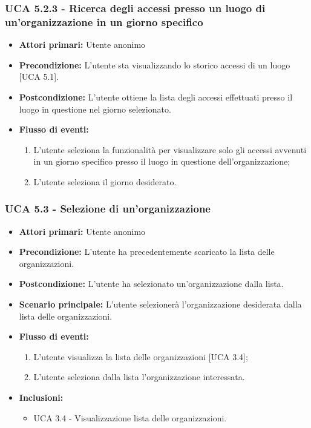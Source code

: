 \subsubsection{UCA 5.2.3 - Ricerca degli accessi presso un luogo di un'organizzazione in un giorno specifico}
\begin{itemize}
    \item \textbf{Attori primari:} Utente anonimo
    \item \textbf{Precondizione:} L'utente sta visualizzando lo storico accessi di un luogo [UCA 5.1].
    \item \textbf{Postcondizione:} L'utente ottiene la lista degli accessi effettuati presso il luogo in questione nel giorno selezionato.
    \item \textbf{Flusso di eventi:}
    \begin{enumerate}
        \item L'utente seleziona la funzionalità per visualizzare solo gli accessi avvenuti in un giorno specifico presso il luogo in questione dell'organizzazione;
        \item L'utente seleziona il giorno desiderato.
    \end{enumerate}
\end{itemize}

\subsubsection{UCA 5.3 - Selezione di un'organizzazione}
\begin{itemize}
    \item \textbf{Attori primari:} Utente anonimo
    \item \textbf{Precondizione:} L'utente ha precedentemente scaricato la lista delle organizzazioni.
    \item \textbf{Postcondizione:} L'utente ha selezionato un'organizzazione dalla lista.
    \item \textbf{Scenario principale:} L'utente selezionerà l'organizzazione desiderata dalla lista delle organizzazioni.
    \item \textbf{Flusso di eventi:}
    \begin{enumerate}
        \item L'utente visualizza la lista delle organizzazioni [UCA 3.4];
        \item L'utente seleziona dalla lista l'organizzazione interessata.
    \end{enumerate}
    \item \textbf{Inclusioni:}
    \begin{itemize}
        \item UCA 3.4 - Visualizzazione lista delle organizzazioni.
    \end{itemize}
\end{itemize}
